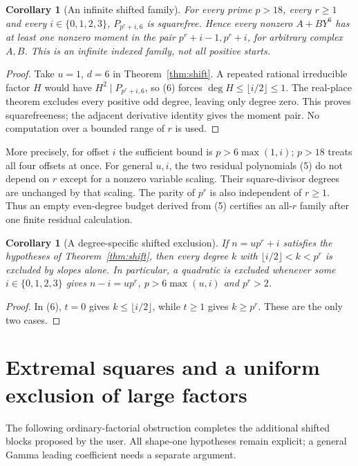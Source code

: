 \documentclass[11pt]{article}
\newtheorem{corollary}[theorem]{Corollary}
\begin{document}
\begin{corollary}[An infinite shifted family]\label{cor:infinite}
For every prime $p>18$, every $r\ge1$ and every $i\in\{0,1,2,3\}$,
$P_{p^r+i,6}$ is squarefree. Hence every nonzero $A+BY^6$ has at least
one nonzero moment in the pair $p^r+i-1,p^r+i$, for arbitrary complex
$A,B$. This is an infinite indexed family, not all positive starts.
\end{corollary}
\begin{proof}
Take $u=1$, $d=6$ in Theorem~\ref{thm:shift}. A repeated rational
irreducible factor $H$ would have $H^2\mid P_{p^r+i,6}$, so (6) forces
$\deg H\le\lfloor i/2\rfloor\le1$. The real-place
theorem excludes every positive odd degree, leaving only degree zero.
This proves squarefreeness; the adjacent derivative identity gives the
moment pair. No computation over a bounded range of $r$ is used.
\end{proof}
More precisely, for offset $i$ the sufficient bound is
$p>6\max(1,i)$; $p>18$ treats all four offsets at once.
For general $u,i$, the two residual polynomials (5) do not depend on
$r$ except for a nonzero variable scaling. Their square-divisor degrees
are unchanged by that scaling. The parity of $p^r$ is also independent
of $r\ge1$. Thus an empty even-degree budget derived from (5) certifies
an all-$r$ family after one finite residual calculation.

\begin{corollary}[A degree-specific shifted exclusion]\label{cor:degree}
If $n=up^r+i$ satisfies the hypotheses of Theorem~\ref{thm:shift}, then
every degree $k$ with $\lfloor i/2\rfloor<k<p^r$ is excluded by slopes
alone. In particular, a quadratic is excluded whenever some
$i\in\{0,1,2,3\}$ gives $n-i=up^r$, $p>6\max(u,i)$ and $p^r>2$.
\end{corollary}
\begin{proof}
In (6), $t=0$ gives $k\le\lfloor i/2\rfloor$, while $t\ge1$ gives
$k\ge p^r$. These are the only two cases.
\end{proof}

\section{Extremal squares and a uniform exclusion of large factors}
The following ordinary-factorial obstruction completes the additional
shifted blocks proposed by the user. All shape-one hypotheses remain
explicit; a general Gamma leading coefficient needs a separate argument.
\end{document}
